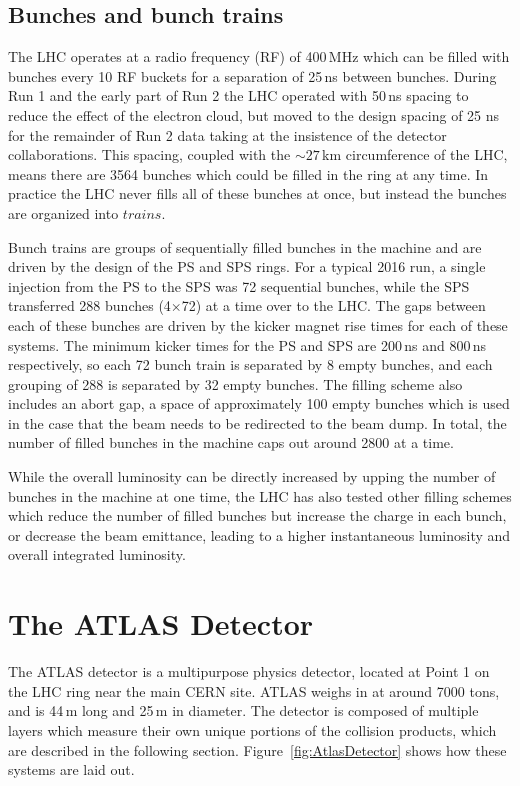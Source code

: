 \subsection{Bunches and bunch trains}

The LHC operates at a radio frequency (RF) of 400\,MHz which can be filled with bunches every 10 RF buckets for a separation of 25\,ns between bunches.\cite{Boussard:410377}  During Run 1 and the early part of Run 2 the LHC operated with 50\,ns spacing to reduce the effect of the electron cloud, but moved to the design spacing of 25 ns for the remainder of Run 2 data taking at the insistence of the detector collaborations.  This spacing, coupled with the $\sim27$\,km circumference of the LHC, means there are 3564 bunches which could be filled in the ring at any time.  In practice the LHC never fills all of these bunches at once, but instead the bunches are organized into $trains$.

Bunch trains are groups of sequentially filled bunches in the machine and are driven by the design of the PS and SPS rings.  For a typical 2016 run, a single injection from the PS to the SPS was 72 sequential bunches, while the SPS transferred 288 bunches (4$\times$72) at a time over to the LHC.\cite{Bartmann:IPAC2017-TUPVA007}  The gaps between each of these bunches are driven by the kicker magnet rise times for each of these systems.  The minimum kicker times for the PS and SPS are 200\,ns and 800\,ns respectively, so each 72 bunch train is separated by 8 empty bunches, and each grouping of 288 is separated by 32 empty bunches.  The filling scheme also includes an abort gap, a space of approximately 100 empty bunches which is used in the case that the beam needs to be redirected to the beam dump.  In total, the number of filled bunches in the machine caps out around 2800 at a time.

While the overall luminosity can be directly increased by upping the number of bunches in the machine at one time, the LHC has also tested other filling schemes which reduce the number of filled bunches but increase the charge in each bunch, or decrease the beam emittance, leading to a higher instantaneous luminosity and overall integrated luminosity.

\section{The ATLAS Detector}

The ATLAS detector is a multipurpose physics detector, located at Point 1 on the LHC ring near the main CERN site.  ATLAS weighs in at around 7000 tons, and is 44\,m long and 25\,m in diameter.  The detector is composed of multiple layers which measure their own unique portions of the collision products, which are described in the following section.  Figure~\ref{fig:AtlasDetector} shows how these systems are laid out.

